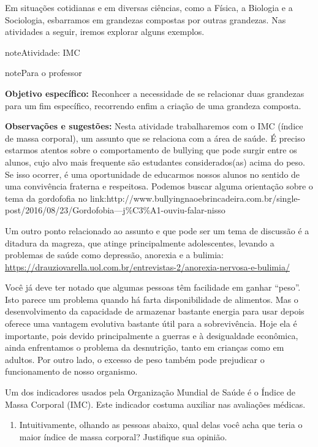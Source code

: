 Em situações cotidianas e em diversas ciências, como a Física, a Biologia e a Sociologia, esbarramos em grandezas compostas por outras grandezas.  Nas atividades a seguir, iremos explorar alguns  exemplos.
\label{\detokenize{NO103-2:ativ-unidades-medida-e-og-imc}}
\begin{sphinxadmonition}{note}{Atividade: IMC}

\begin{sphinxadmonition}{note}{Para o professor}

\textbf{Objetivo específico:}
Reconhcer a necessidade de se relacionar duas grandezas para um fim específico, recorrendo enfim a criação de uma grandeza composta.

\textbf{Observações e sugestões:}
Nesta atividade trabalharemos com o IMC (índice de massa corporal), um assunto que se relaciona com a área de saúde.  É preciso estarmos atentos sobre o comportamento de bullying que pode surgir entre os alunos, cujo alvo mais frequente são estudantes considerados(as) acima do peso.  Se isso ocorrer, é uma oportunidade de educarmos nossos alunos no sentido de uma convivência fraterna e respeitosa. Podemos buscar alguma orientação sobre o tema da gordofofia no link:http://www.bullyingnaoebrincadeira.com.br/single-post/2016/08/23/Gordofobia—j\%C3\%A1-ouviu-falar-nisso

Um outro ponto relacionado ao assunto e que pode ser um tema de discussão é a ditadura da magreza, que atinge principalmente adolescentes, levando a problemas de saúde como depressão, anorexia e a bulimia: \url{https://drauziovarella.uol.com.br/entrevistas-2/anorexia-nervosa-e-bulimia/}
\end{sphinxadmonition}

Você já deve ter notado que algumas pessoas têm facilidade em ganhar “peso”. Isto parece um problema quando há farta disponibilidade de alimentos. Mas o desenvolvimento da capacidade de armazenar bastante energia para usar depois oferece uma vantagem evolutiva bastante útil para a sobrevivência. Hoje ela é importante, pois devido principalmente a guerras e à desigualdade econômica, ainda enfrentamos o problema da desnutrição, tanto em crianças como em adultos. Por outro lado, o excesso de peso também pode prejudicar o funcionamento de nosso organismo.

Um dos indicadores usados pela Organização Mundial de Saúde  é o Índice de Massa Corporal (IMC). Este indicador costuma auxiliar nas avaliações médicas.
\begin{enumerate}
\item {} 
Intuitivamente, olhando as pessoas abaixo, qual delas você acha que teria o maior índice de massa corporal? Justifique sua opinião.


\end{enumerate}
\end{sphinxadmonition}
